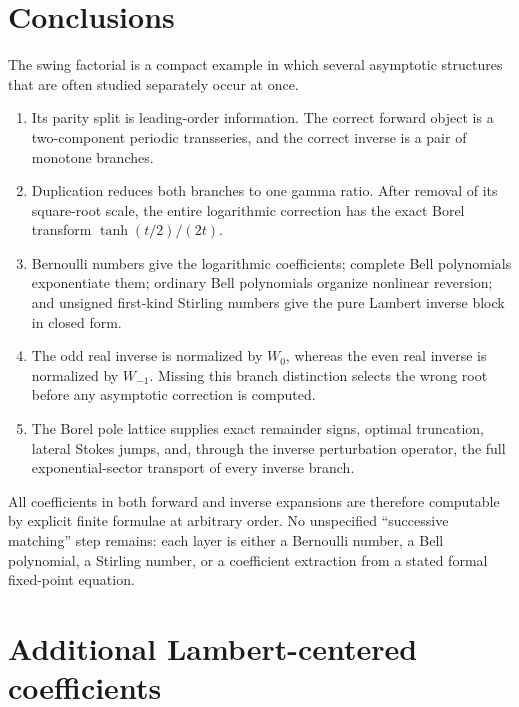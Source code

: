 \documentclass[11pt,a4paper]{article}
\numberwithin{equation}{section}
\theoremstyle{definition}
\theoremstyle{remark}
\begin{document}
\section{Conclusions}

The swing factorial is a compact example in which several asymptotic
structures that are often studied separately occur at once.

\begin{enumerate}
\item Its parity split is leading-order information.  The correct forward
      object is a two-component periodic transseries, and the correct inverse
      is a pair of monotone branches.
\item Duplication reduces both branches to one gamma ratio.  After removal of
      its square-root scale, the entire logarithmic correction has the exact
      Borel transform \(\tanh(t/2)/(2t)\).
\item Bernoulli numbers give the logarithmic coefficients; complete Bell
      polynomials exponentiate them; ordinary Bell polynomials organize
      nonlinear reversion; and unsigned first-kind Stirling numbers give the
      pure Lambert inverse block in closed form.
\item The odd real inverse is normalized by \(W_0\), whereas the even real
      inverse is normalized by \(W_{-1}\).  Missing this branch distinction
      selects the wrong root before any asymptotic correction is computed.
\item The Borel pole lattice supplies exact remainder signs, optimal
      truncation, lateral Stokes jumps, and, through the inverse perturbation
      operator, the full exponential-sector transport of every inverse
      branch.
\end{enumerate}

All coefficients in both forward and inverse expansions are therefore
computable by explicit finite formulae at arbitrary order.  No unspecified
``successive matching'' step remains: each layer is either a Bernoulli
number, a Bell polynomial, a Stirling number, or a coefficient extraction
from a stated formal fixed-point equation.

\appendix

\section{Additional Lambert-centered coefficients}
\end{document}

